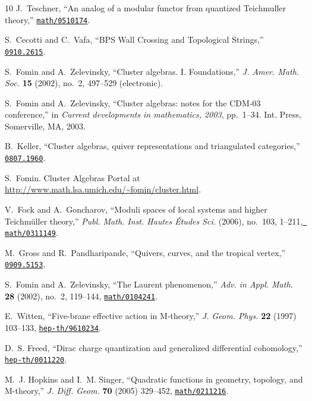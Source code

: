 \begin{thebibliography}{10}
J.~Teschner, ``{An analog of a modular functor from quantized Teichmuller
  theory},''
\href{http://www.arXiv.org/abs/math/0510174}{{\tt math/0510174}}.

S.~Cecotti and C.~Vafa, ``{BPS Wall Crossing and Topological Strings},''
\href{http://www.arXiv.org/abs/0910.2615}{{\tt 0910.2615}}.

S.~Fomin and A.~Zelevinsky, ``Cluster algebras. {I}. {F}oundations,'' {\em J.
  Amer. Math. Soc.} {\bf 15} (2002), no.~2, 497--529 (electronic).

S.~Fomin and A.~Zelevinsky, ``Cluster algebras: notes for the {CDM}-03
  conference,'' in {\em Current developments in mathematics, 2003}, pp.~1--34.
\newblock Int. Press, Somerville, MA, 2003.

B.~Keller, ``{C}luster algebras, quiver representations and triangulated
  categories,'' \href{http://www.arXiv.org/abs/0807.1960}{{\tt 0807.1960}}.

S.~Fomin.
\newblock Cluster Algebras Portal at
  \url{http://www.math.lsa.umich.edu/~fomin/cluster.html}.

V.~Fock and A.~Goncharov, ``Moduli spaces of local systems and higher
  {T}eichm\"uller theory,'' {\em Publ. Math. Inst. Hautes \'Etudes Sci.}
  (2006), no.~103, 1--211, \href{http://www.arXiv.org/abs/math/0311149}{{\tt
  math/0311149}}.

M.~Gross and R.~Pandharipande, ``{Q}uivers, curves, and the tropical vertex,''
  \href{http://www.arXiv.org/abs/0909.5153}{{\tt 0909.5153}}.

S.~Fomin and A.~Zelevinsky, ``The {L}aurent phenomenon,'' {\em Adv. in Appl.
  Math.} {\bf 28} (2002), no.~2, 119--144,
  \href{http://www.arXiv.org/abs/math/0104241}{{\tt math/0104241}}.

E.~Witten, ``{Five-brane effective action in {M}-theory},'' {\em J. Geom.
  Phys.} {\bf 22} (1997) 103--133,
\href{http://www.arXiv.org/abs/hep-th/9610234}{{\tt hep-th/9610234}}.

D.~S. Freed, ``{Dirac charge quantization and generalized differential
  cohomology},''
\href{http://www.arXiv.org/abs/hep-th/0011220}{{\tt hep-th/0011220}}.

M.~J. Hopkins and I.~M. Singer, ``{Quadratic functions in geometry, topology,
  and {M}-theory},'' {\em J. Diff. Geom.} {\bf 70} (2005) 329--452,
\href{http://www.arXiv.org/abs/math/0211216}{{\tt math/0211216}}.


\end{thebibliography}
